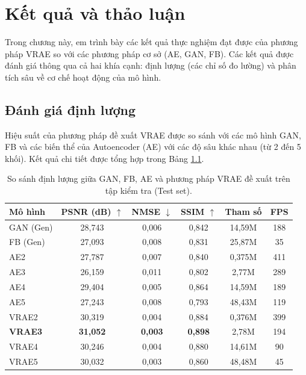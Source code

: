 \chapter{Kết quả và thảo luận}

Trong chương này, em trình bày các kết quả thực nghiệm đạt được của phương pháp VRAE so với các phương pháp cơ sở (AE, GAN, FB). Các kết quả được đánh giá thông qua cả hai khía cạnh: định lượng (các chỉ số đo lường) và phân tích sâu về cơ chế hoạt động của mô hình.

\section{Đánh giá định lượng}

Hiệu suất của phương pháp đề xuất VRAE được so sánh với các mô hình GAN, FB và các biến thể của Autoencoder (AE) với các độ sâu khác nhau (từ 2 đến 5 khối). Kết quả chi tiết được tổng hợp trong Bảng \ref{tab:quantitative_comparison}.

\begin{table}[H]
\centering
\caption{So sánh định lượng giữa GAN, FB, AE và phương pháp VRAE đề xuất trên tập kiểm tra (Test set).}
\label{tab:quantitative_comparison}
\begin{tabular}{lccccc}
\hline
\textbf{Mô hình} & \textbf{PSNR (dB) $\uparrow$ } & \textbf{NMSE $\downarrow$ } & \textbf{SSIM $\uparrow$ } & \textbf{Tham số} & \textbf{FPS} \\ \hline
GAN (Gen) & 28,743 & 0,006 & 0,842 & 14,59M & 188 \\
FB (Gen) & 27,093 & 0,008 & 0,831 & 25,87M & 35 \\
AE2 & 27,787 & 0,007 & 0,840 & 0,375M & 411 \\
AE3 & 26,159 & 0,011 & 0,802 & 2,77M & 289 \\
AE4 & 29,404 & 0,005 & 0,864 & 14,59M & 189 \\
AE5 & 27,243 & 0,008 & 0,793 & 48,43M & 119 \\ \hline
VRAE2 & 30,319 & 0,004 & 0,884 & 0,376M & 399 \\
\textbf{VRAE3} & \textbf{31,052} & \textbf{0,003} & \textbf{0,898} & 2,78M & 194 \\
VRAE4 & 30,246 & 0,004 & 0,880 & 14,61M & 90 \\
VRAE5 & 30,032 & 0,003 & 0,860 & 48,48M & 45 \\ \hline
\end{tabular}
\end{table}


